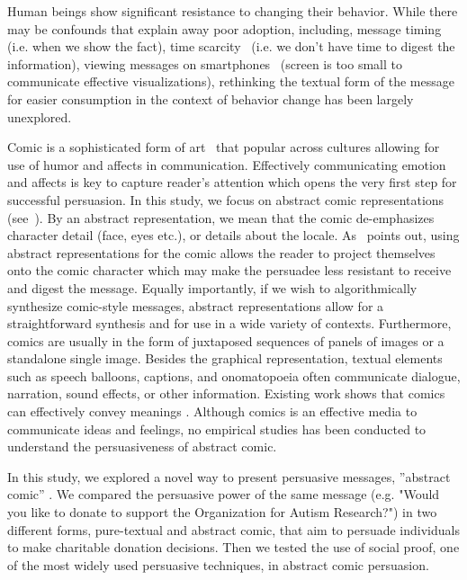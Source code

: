 Human beings show significant resistance to changing their behavior. While there may be confounds that explain away poor adoption, including, message timing~\cite{Fogg2009} (i.e. when we show the fact), time scarcity~\cite{Janssen2016} (i.e. we don't have time to digest the information), viewing messages on smartphones~\cite{Kim2016} (screen is too small to communicate effective visualizations), rethinking the textual form of the message for easier consumption in the context of behavior change has been largely unexplored.  
 
Comic is a sophisticated form of art~\cite{scott1993understanding} that popular across cultures allowing for use of humor and affects in communication. Effectively communicating emotion and affects is key to capture reader's attention which opens the very first step for successful persuasion. In this study, we focus on abstract comic representations (see~). By an abstract representation, we mean that the comic de-emphasizes character detail (face, eyes etc.), or details about the locale. As~\textcite{scott1993understanding} points out, using abstract representations for the comic allows the reader to project themselves onto the comic character which may make the persuadee less resistant to receive and digest the message. Equally importantly, if we wish to algorithmically synthesize comic-style messages, abstract representations allow for a straightforward synthesis and for use in a wide variety of contexts. Furthermore, comics are usually in the form of juxtaposed sequences of panels of images or a standalone single image. Besides the graphical representation, textual elements such as speech balloons, captions, and onomatopoeia often communicate dialogue, narration, sound effects, or other information. Existing work shows that comics can effectively convey meanings \cite{McDermottPB18,cary2004going,scott1993understanding}. Although comics is an effective media to communicate ideas and feelings, no empirical studies has been conducted to understand the persuasiveness of abstract comic.

In this study, we explored a novel way to present persuasive messages, ''abstract comic'' . We compared the persuasive power of the same message (e.g. "Would you like to donate to support the Organization for Autism Research?") in two different forms, pure-textual and abstract comic, that aim to persuade individuals to make charitable donation decisions. Then we tested the use of social proof, one of the most widely used persuasive techniques, in abstract comic persuasion. 

